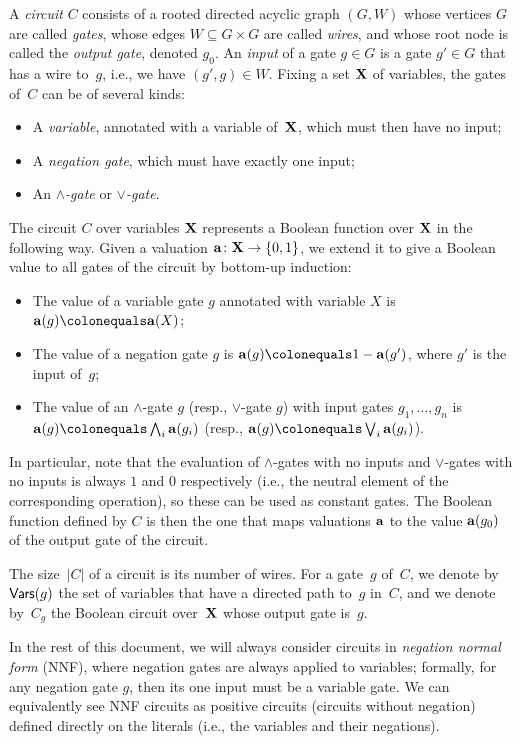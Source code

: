 A \emph{circuit} $C$ consists of a rooted directed acyclic graph $(G, W)$ whose vertices $G$ are called \emph{gates}, whose edges $W \subseteq G \times G$ are called \emph{wires}, and whose root node is called the \emph{output gate}, denoted $g_0$. 
An \emph{input} of a gate $g \in G$ is a gate $g' \in G$ that has a wire to~$g$, i.e., we have $(g', g) \in W$.
Fixing a set $\mathbf{X}$ of variables, the gates of~$C$ can be of several kinds:
\begin{itemize}
\item A \emph{variable}, annotated with a variable of~$\mathbf{X}$, which must then have no input;
\item A \emph{negation gate}, which must have exactly one input;
\item An \emph{$\land$-gate} or \emph{$\lor$-gate}.
\end{itemize}
The circuit $C$ over variables $\mathbf{X}$ represents a Boolean function over $\mathbf{X}$ in the following way.
Given a valuation $\mathbf{a}\colon \mathbf{X} \to \{0, 1\}$, we extend it to give a Boolean value to all gates of the circuit by bottom-up induction:
\begin{itemize}
    \item The value of a variable gate $g$ annotated with variable $X$ is $\ba(g) \colonequals \ba(X)$;
    \item The value of a negation gate $g$ is $\ba(g) \colonequals 1 - \ba(g')$, where $g'$ is the input of~$g$;
    \item The value of an $\land$-gate $g$ (resp., $\lor$-gate $g$) with input gates $g_1, \ldots, g_n$ is $\ba(g) \colonequals \bigwedge_i \ba(g_i)$ (resp., $\ba(g) \colonequals \bigvee_i \ba(g_i)$).
\end{itemize}
In particular, note that the evaluation of $\land$-gates with no inputs and $\lor$-gates with no inputs is always $1$ and $0$ respectively (i.e., the neutral element of the corresponding operation), so these can be used as constant gates. The Boolean function defined by $C$ is then the one that maps valuations $\mathbf{a}$ to the value $\mathbf{a}(g_0)$ of the output gate of the circuit.

The size~$|C|$ of a circuit is its number
of wires.  For a gate~$g$ of~$C$, we denote by~$\mathsf{Vars}(g)$ the set of variables
that have a directed path to~$g$ in~$C$, and we denote by~$C_g$ the Boolean
circuit over~$\mathbf{X}$ whose output gate is~$g$. 

In the rest of this document, we will always consider circuits in \emph{negation normal form} (NNF), where negation gates are always applied to variables; formally, for any negation gate $g$, then its one input must be a variable gate. We can equivalently see NNF circuits as positive circuits (circuits without negation) defined directly on the literals (i.e., the variables and their negations).


